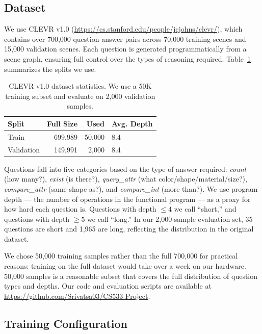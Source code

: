 \documentclass[11pt,twocolumn]{article}
\begin{document}
\subsection{Dataset}

We use CLEVR v1.0 \cite{johnson2017clevr} (\url{https://cs.stanford.edu/people/jcjohns/clevr/}), which contains over 700,000 question-answer pairs across 70,000 training scenes and 15,000 validation scenes. Each question is generated programmatically from a scene graph, ensuring full control over the types of reasoning required. Table~\ref{tab:data} summarizes the splits we use.

\begin{table}[h]
\centering
\small
\begin{tabular}{lrrl}
\toprule
\textbf{Split} & \textbf{Full Size} & \textbf{Used} & \textbf{Avg. Depth} \\
\midrule
Train      & 699,989 & 50,000 & 8.4 \\
Validation & 149,991 &  2,000 & 8.4 \\
\bottomrule
\end{tabular}
\caption{CLEVR v1.0 dataset statistics. We use a 50K training subset and evaluate on 2,000 validation samples.}
\label{tab:data}
\end{table}

Questions fall into five categories based on the type of answer required: \textit{count} (how many?), \textit{exist} (is there?), \textit{query\_attr} (what color/shape/material/size?), \textit{compare\_attr} (same shape as?), and \textit{compare\_int} (more than?). We use program depth — the number of operations in the functional program — as a proxy for how hard each question is. Questions with depth $\leq 4$ we call ``short,'' and questions with depth $\geq 5$ we call ``long.'' In our 2,000-sample evaluation set, 35 questions are short and 1,965 are long, reflecting the distribution in the original dataset.

We chose 50,000 training samples rather than the full 700,000 for practical reasons: training on the full dataset would take over a week on our hardware. 50,000 samples is a reasonable subset that covers the full distribution of question types and depths. Our code and evaluation scripts are available at \url{https://github.com/Srivatsa03/CS533-Project}.

\subsection{Training Configuration}
\end{document}
